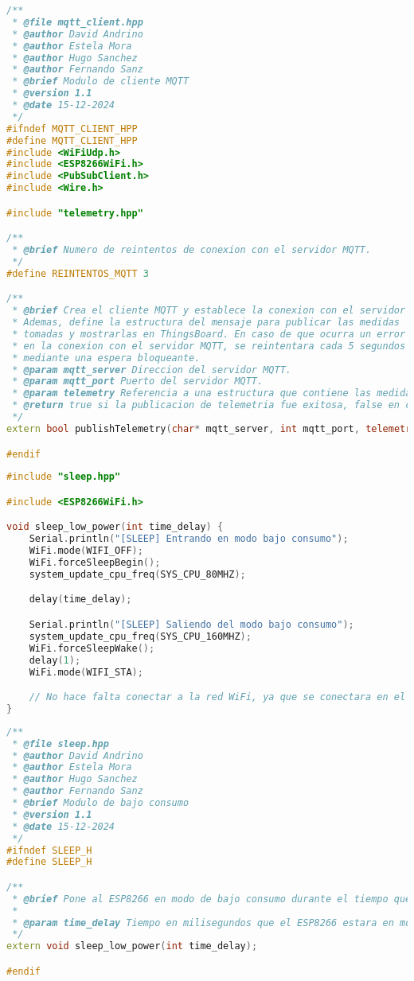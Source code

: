 \begin{lstlisting}[language=c++,caption={Fichero\texttt{mqtt\_client.hpp}}, captionpos=b]
/**
 * @file mqtt_client.hpp
 * @author David Andrino
 * @author Estela Mora
 * @author Hugo Sanchez
 * @author Fernando Sanz
 * @brief Modulo de cliente MQTT
 * @version 1.1
 * @date 15-12-2024
 */
#ifndef MQTT_CLIENT_HPP
#define MQTT_CLIENT_HPP
#include <WiFiUdp.h>
#include <ESP8266WiFi.h>
#include <PubSubClient.h>
#include <Wire.h>

#include "telemetry.hpp"

/** 
 * @brief Numero de reintentos de conexion con el servidor MQTT.
 */
#define REINTENTOS_MQTT 3

/**
 * @brief Crea el cliente MQTT y establece la conexion con el servidor MQTT.
 * Ademas, define la estructura del mensaje para publicar las medidas
 * tomadas y mostrarlas en ThingsBoard. En caso de que ocurra un error
 * en la conexion con el servidor MQTT, se reintentara cada 5 segundos
 * mediante una espera bloqueante.
 * @param mqtt_server Direccion del servidor MQTT.
 * @param mqtt_port Puerto del servidor MQTT.
 * @param telemetry Referencia a una estructura que contiene las medidas de telemetria.
 * @return true si la publicacion de telemetria fue exitosa, false en caso contrario.
 */
extern bool publishTelemetry(char* mqtt_server, int mqtt_port, telemetry_t& telemetry);

#endif
\end{lstlisting}

\begin{lstlisting}[language=c++,caption={Fichero\texttt{sleep.cpp}}, captionpos=b]
#include "sleep.hpp"

#include <ESP8266WiFi.h>

void sleep_low_power(int time_delay) {
    Serial.println("[SLEEP] Entrando en modo bajo consumo");
    WiFi.mode(WIFI_OFF);
    WiFi.forceSleepBegin();
    system_update_cpu_freq(SYS_CPU_80MHZ);

    delay(time_delay);

    Serial.println("[SLEEP] Saliendo del modo bajo consumo");
    system_update_cpu_freq(SYS_CPU_160MHZ);
    WiFi.forceSleepWake();
    delay(1);
    WiFi.mode(WIFI_STA);

    // No hace falta conectar a la red WiFi, ya que se conectara en el loop
}
\end{lstlisting}

\begin{lstlisting}[language=c++,caption={Fichero\texttt{sleep.hpp}}, captionpos=b]
/**
 * @file sleep.hpp
 * @author David Andrino
 * @author Estela Mora
 * @author Hugo Sanchez
 * @author Fernando Sanz
 * @brief Modulo de bajo consumo
 * @version 1.1
 * @date 15-12-2024
 */
#ifndef SLEEP_H
#define SLEEP_H

/**
 * @brief Pone al ESP8266 en modo de bajo consumo durante el tiempo que se le indique
 * 
 * @param time_delay Tiempo en milisegundos que el ESP8266 estara en modo de bajo consumo
 */
extern void sleep_low_power(int time_delay);

#endif 
\end{lstlisting}

